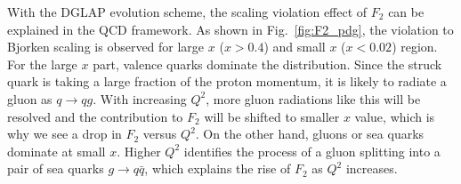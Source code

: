 With the DGLAP evolution scheme, the scaling violation effect of $F_{2}$ can be
explained in the QCD framework. As shown in Fig.~\ref{fig:F2_pdg}, the violation
to Bjorken scaling is observed for large $x$ ($x>0.4$) and small $x$ ($x<0.02$)
region. For the large $x$ part, valence quarks dominate the distribution. Since
the struck quark is taking a large fraction of the proton momentum, it is likely
to radiate a gluon as $q\rightarrow qg$. With increasing $Q^{2}$, more gluon
radiations like this will be resolved and the contribution to $F_{2}$ will be
shifted to smaller $x$ value, which is why we see a drop in $F_{2}$ versus
$Q^{2}$. On the other hand, gluons or sea quarks dominate at small $x$. Higher
$Q^{2}$ identifies the process of a gluon splitting into a pair of sea quarks
$g\rightarrow q\bar{q}$, which explains the rise of $F_{2}$ as $Q^{2}$
increases.

